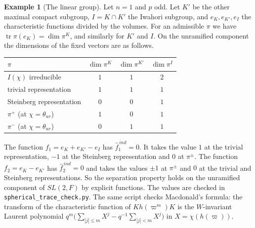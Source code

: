 \documentclass[12pt,letterpaper]{article}
\numberwithin{equation}{section}
\theoremstyle{definition}
\newtheorem{xexample}[theorem]{Example}
\newcommand{\vp}{\varpi}
\DeclareMathOperator{\tr}{tr}
\begin{document}
\begin{xexample}[The linear group]\label{ex:EP}
Let $n=1$ and $p$ odd.  Let $K'$ be the other maximal compact subgroup, $I=K\cap K'$ the
Iwahori subgroup, and $e_K,e_{K'},e_I$ the characteristic functions divided by the
volumes.  For an admissible $\pi$ we have $\tr\pi(e_K)=\dim\pi^K$, and similarly for $K'$
and $I$.  On the unramified component the dimensions of the fixed vectors are as follows.
\begin{center}
\begin{tabular}{lccc}
\toprule
$\pi$ & $\dim\pi^K$ & $\dim\pi^{K'}$ & $\dim\pi^I$\\
\midrule
$I(\chi)$ irreducible & $1$ & $1$ & $2$\\
trivial representation & $1$ & $1$ & $1$\\
Steinberg representation & $0$ & $0$ & $1$\\
$\pi^+$ (at $\chi=\theta_{ur}$) & $1$ & $0$ & $1$\\
$\pi^-$ (at $\chi=\theta_{ur}$) & $0$ & $1$ & $1$\\
\bottomrule
\end{tabular}
\end{center}
The function $f_1=e_K+e_{K'}-e_I$ has $\hat f_1^{\,ind}=0$.  It takes the value $1$ at the
trivial representation, $-1$ at the Steinberg representation and $0$ at $\pi^\pm$.  The
function $f_2=e_K-e_{K'}$ has $\hat f_2^{\,ind}=0$ and takes the values $\pm1$ at $\pi^\pm$
and $0$ at the trivial and Steinberg representations.  So the separation property holds
on the unramified component of $SL(2,F)$ by explicit functions.  The values are checked in
\texttt{spherical\_trace\_check.py}.  The same script checks Macdonald's formula: the
transform of the characteristic function of $Kh(\vp^m)K$ is the $W$-invariant Laurent
polynomial $q^m\bigl(\sum_{|j|\le m}X^j-q^{-1}\sum_{|j|<m}X^j\bigr)$ in $X=\chi(h(\vp))$.
\end{xexample}
\end{document}

